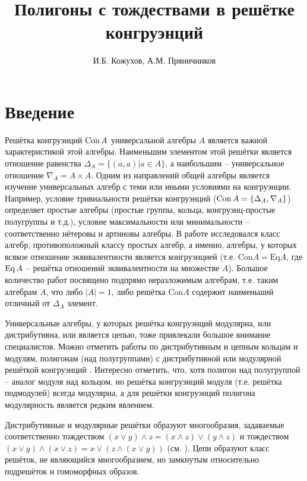 \documentclass[a4paper]{article}
\title{Полигоны с тождествами в решётке конгруэнций}
\author{И.Б. Кожухов, А.М. Пряничников}
\date{}
\newcommand{\Con}{\textnormal{Con}\, }
\newcommand{\Eq}{\textnormal{Eq}\, }
\begin{document}
	
	\maketitle
	
	\section*{Введение}
	
	Решётка конгруэнций $\Con A$ универсальной алгебры $ A $ является важной характеристикой этой алгебры. Наименьшим элементом этой решётки является отношение равенства $ \Delta_A = \{ (a,a) | a \in A \} $, а наибольшим -- универсальное отношение $ \nabla_A = A \times A $. Одним из направлений общей алгебры является изучение универсальных алгебр с теми или иными условиями на конгруэнции. Например, условие тривиальности решётки конгруэнций ($ \Con A = \{ \Delta_A, \nabla_A \} $) определяет простые алгебры (простые группы, кольца, конгруэнц-простые полугруппы и т.д.), условие максимальности или минимальности -- соответственно нётеровы и артиновы алгебры. В работе \cite{resh} исследовался класс алгебр, противоположный классу простых алгебр, а именно, алгебры, у которых всякое отношение эквивалентности является конгруэнцией (т.е. $ \text{Con}A = \text{Eq}A $, где $\Eq A$ -- решётка отношений эквивалентности на множестве $A$). Большое количество работ посвящено подпрямо неразложимым алгебрам, т.е. таким алгебрам $A$, что либо $ |A| = 1 $, либо решётка Con$A$ содержит наименьший отличный от $ \Delta_A $ элемент.
	
	\par Универсальные алгебры, у которых решётка конгруэнций модулярна, или дистрибутивна, или является цепью, тоже привлекали большое внимание специалистов. Можно отметить работы по дистрибутивным и цепным кольцам и модулям, полигонам (над полугруппами) с дистрибутивной или модулярной решёткой конгруэнций \cite{step,hal3}. Интересно отметить, что, хотя полигон над полугруппой -- аналог модуля над кольцом, но решётка конгруэнций модуля (т.е. решётка подмодулей) всегда модулярна, а для решётки конгруэнций полигона модулярность является редким явлением.
	\par Дистрибутивные и модулярные решётки образуют многообразия, задаваемые соответственно тождеством $ (x \vee y) \wedge z = (x \wedge z ) \vee (y \wedge z) $ и тождеством $ (x \vee y) \wedge (x \vee z) = x \vee (z \wedge (x \vee y)) $ (см. \cite[глава 5, теорема 347]{gretz}). Цепи образуют класс решёток, не являющийся многообразием, но замкнутым относительно подрешёток и гомоморфных образов.
	
\end{document}
